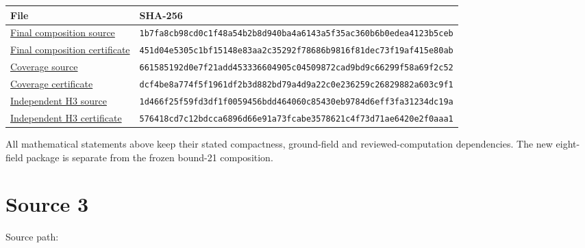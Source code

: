 \documentclass[
  10pt,
]{report}
\newcounter{none} %
\begin{document}
{\def\LTcaptype{none} %
\begin{longtable}[]{@{}
  >{\raggedright\arraybackslash}p{}
  >{\raggedright\arraybackslash}p{}@{}}
\toprule\noalign{}
\begin{minipage}[b]{\linewidth}\raggedright
File
\end{minipage} & \begin{minipage}[b]{\linewidth}\raggedright
SHA-256
\end{minipage} \\
\midrule\noalign{}
\endhead
\bottomrule\noalign{}
\endlastfoot
\href{../scripts/fresh_arithmetic_dimension21_composition_20261016.py}{Final
composition source} &
\nolinkurl{1b7fa8cb98cd0c1f48a54b2b8d940ba4a6143a5f35ac360b6b0edea4123b5ceb} \\
\href{fresh_arithmetic_dimension21_composition_20261016_bound21.json}{Final
composition certificate} &
\nolinkurl{451d04e5305c1bf15148e83aa2c35292f78686b9816f81dec73f19af415e80ab} \\
\href{../scripts/fresh_sqrt5_h3_hub_coverage_20261016.py}{Coverage
source} &
\nolinkurl{661585192d0e7f21add453336604905c04509872cad9bd9c66299f58a69f2c52} \\
\href{fresh_sqrt5_h3_hub_coverage_20261016_bound21.json}{Coverage
certificate} &
\nolinkurl{dcf4be8a774f5f1961df2b3d882bd79a4d9a22c0e236259c26829882a603c9f1} \\
\href{../scripts/fresh_sqrt5_dimension22_h3_cross_20261016_review.py}{Independent
H3 source} &
\nolinkurl{1d466f25f59fd3df1f0059456bdd464060c85430eb9784d6eff3fa31234dc19a} \\
\href{fresh_sqrt5_dimension22_h3_cross_20261016_review.json}{Independent
H3 certificate} &
\nolinkurl{576418cd7c12bdcca6896d66e91a73fcabe3578621c4f73d71ae6420e2f0aaa1} \\
\end{longtable}
}

All mathematical statements above keep their stated compactness,
ground-field and reviewed-computation dependencies. The new eight-field
package is separate from the frozen bound-21 composition.

\clearpage

\chapter{Source 3}\label{source-3}

Source path: 
\end{document}
